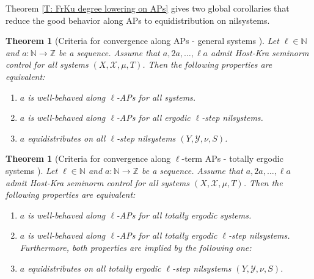 \documentclass[11pt]{amsart}
\newtheorem{theorem}[lemma]{Theorem}
\theoremstyle{definition}
\newcommand{\N}{{\mathbb N}}
\newcommand{\Z}{{\mathbb Z}}
\newcommand{\CX}{{\mathcal X}}
\newcommand{\CY}{{\mathcal Y}}
\newcommand{\1}{{\mathbf{1}}}
\begin{document}
Theorem \ref{T: FrKu degree lowering on APs} gives two global corollaries that reduce the good behavior along APs to equidistribution on nilsystems. 
\begin{theorem}[Criteria for convergence along APs - general systems {\cite[Theorem 3.1]{FrKu22c}}]\label{T:APsConvergence}
	Let $\ell\in\N$ and $a\colon \N\to \Z$ be a sequence. Assume that $a, 2a, \ldots, \ell a$ admit Host-Kra seminorm control for all systems $(X, \CX, \mu, T)$. Then the  following   properties are equivalent:
	\begin{enumerate}
		\item $a$ is well-behaved along $\ell$-APs  for all  systems.
		
		\item $a$ is well-behaved along $\ell$-APs
		for all  ergodic $\ell$-step nilsystems.
		
		\item  $a$ equidistributes on all $\ell$-step nilsystems $(Y, \CY, \nu, S)$.
	\end{enumerate}
\end{theorem}

\begin{theorem}[Criteria for  convergence along $\ell$-term APs - totally ergodic systems {\cite[Theorem 3.2]{FrKu22c}}]\label{T:APsConvergenceTE}
	Let $\ell\in\N$ and $a\colon \N\to \Z$ be a sequence. Assume that $a, 2a, \ldots, \ell a$ admit Host-Kra seminorm control for all systems $(X, \CX, \mu, T)$. Then the following   properties are equivalent:
	\begin{enumerate}
		\item $a$ is well-behaved along $\ell$-APs for all  totally ergodic systems.
		
		\item  $a$ is well-behaved along $\ell$-APs for all  totally ergodic $\ell$-step nilsystems.
		Furthermore, both properties are implied by the following one:
		\item   $a$  equidistributes on all totally ergodic $\ell$-step nilsystems $(Y, \CY, \nu, S)$.
	\end{enumerate}
\end{theorem}

\end{document}
